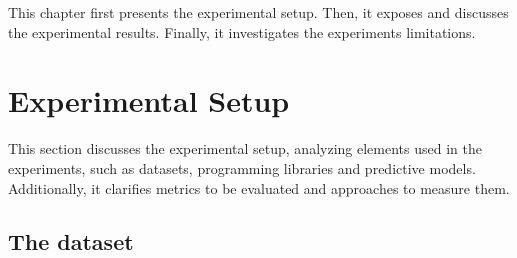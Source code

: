 
%


This chapter first presents the experimental setup. Then, it exposes and discusses the experimental results. Finally, it investigates the experiments limitations. 

\section{Experimental Setup}

This section discusses the experimental setup, analyzing elements used in the experiments, such as datasets, programming libraries and predictive models. Additionally, it clarifies metrics to be evaluated and approaches to measure them.  

\subsection{The dataset}

